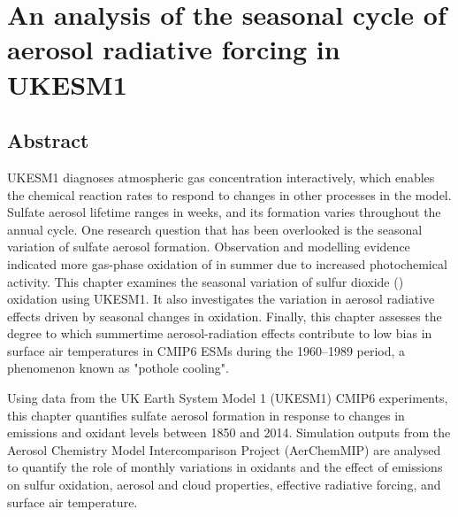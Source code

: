 
\chapter {An analysis of the seasonal cycle of aerosol radiative forcing in UKESM1}
\label{ch4:title}

\section*{Abstract}

UKESM1 diagnoses atmospheric gas concentration interactively, which enables the chemical reaction rates to respond to changes in other processes in the model. Sulfate aerosol lifetime ranges in weeks, and its formation varies throughout the annual cycle. One research question that has been overlooked is the seasonal variation of sulfate aerosol formation. Observation and modelling evidence indicated more gas-phase oxidation of  in summer due to increased photochemical activity. This chapter examines the seasonal variation of sulfur dioxide () oxidation using UKESM1. It also investigates the variation in aerosol radiative effects driven by seasonal changes in oxidation. Finally, this chapter assesses the degree to which summertime aerosol-radiation effects contribute to low bias in surface air temperatures in CMIP6 ESMs during the 1960--1989 period, a phenomenon known as "pothole cooling".  

Using data from the UK Earth System Model 1 (UKESM1) CMIP6 experiments, this chapter quantifies sulfate aerosol formation in response to changes in emissions and oxidant levels between 1850 and 2014. Simulation outputs from the Aerosol Chemistry Model Intercomparison Project (AerChemMIP) are analysed to quantify the role of monthly variations in oxidants and the effect of emissions on sulfur oxidation, aerosol and cloud properties, effective radiative forcing, and surface air temperature. 

